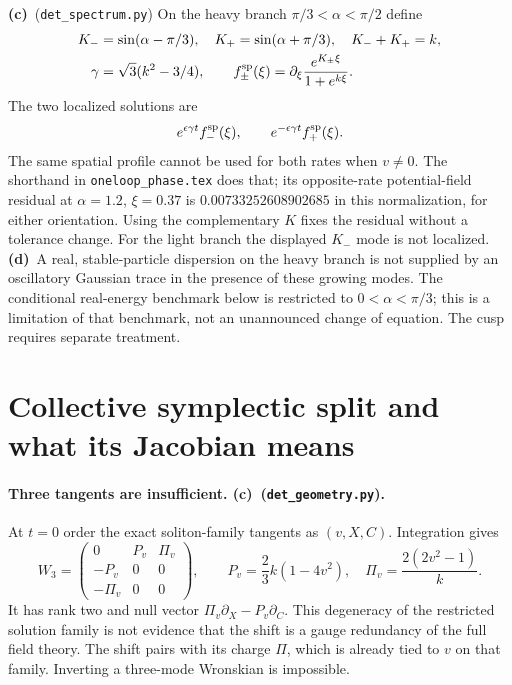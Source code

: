 \documentclass[11pt,a4paper]{article}
\newcommand{\Lc}{\textbf{(c)}}
\newcommand{\Ld}{\textbf{(d)}}
\newcommand{\G}{\texttt{det\_geometry.py}}
\newcommand{\Scheck}{\texttt{det\_spectrum.py}}
\begin{document}
\Lc\ (\Scheck) On the heavy branch $\pi/3<\alpha<\pi/2$ define
\begin{align}
 K_-&=\sin(\alpha-\pi/3),\quad K_+=\sin(\alpha+\pi/3),\quad K_-+K_+=k,\\
 \gamma&=\sqrt3(k^2-3/4),\qquad
 f_\pm^{\rm sp}(\xi)=\partial_\xi\frac{e^{K_\pm\xi}}{1+e^{k\xi}}.
\end{align}
The two localized solutions are
\begin{equation}
 e^{\epsilon\gamma t}f_-^{\rm sp}(\xi),\qquad
 e^{-\epsilon\gamma t}f_+^{\rm sp}(\xi).\label{eq:heavy}
\end{equation}
The same spatial profile cannot be used for both rates when $v\ne0$.
The shorthand in \texttt{oneloop\_phase.tex} does that; its opposite-rate
potential-field residual at $\alpha=1.2$, $\xi=0.37$ is
$0.00733252608902685$ in this normalization, for either orientation.
Using the complementary $K$ fixes the residual without a tolerance change.
For the light branch the displayed $K_-$ mode is not localized.
\Ld\ A real, stable-particle dispersion on the heavy branch is not supplied
by an oscillatory Gaussian trace in the presence of these growing modes.
The conditional real-energy benchmark below is restricted to
$0<\alpha<\pi/3$; this is a limitation of that benchmark, not an unannounced
change of equation. The cusp requires separate treatment.

\section{Collective symplectic split and what its Jacobian means}
\paragraph{Three tangents are insufficient. \Lc\ (\G).}
At $t=0$ order the exact soliton-family tangents as $(v,X,C)$. Integration gives
\begin{equation}
 W_3=\begin{pmatrix}0&P_v&\Pi_v\\-P_v&0&0\\-\Pi_v&0&0\end{pmatrix},\qquad
 P_v=\frac23k(1-4v^2),\quad \Pi_v=\frac{2(2v^2-1)}k.
 \label{eq:W3}
\end{equation}
It has rank two and null vector
$\Pi_v\partial_X-P_v\partial_C$. This degeneracy of the restricted
solution family is not evidence that the shift is a gauge redundancy of the
full field theory. The shift pairs with its charge $\Pi$, which is already
tied to $v$ on that family. Inverting a three-mode Wronskian is impossible.
\end{document}
